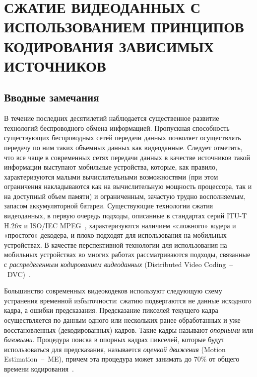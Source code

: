 \newpage
\chapter{СЖАТИЕ ВИДЕОДАННЫХ С ИСПОЛЬЗОВАНИЕМ ПРИНЦИПОВ КОДИРОВАНИЯ ЗАВИСИМЫХ ИСТОЧНИКОВ}
\label{chap1}

\section{Вводные замечания}

В течение последних десятилетий наблюдается существенное развитие технологий беспроводного обмена информацией. Пропускная способность существующих беспроводных сетей передачи данных позволяет осуществлять передачу по ним таких объемных данных как видеоданные. Следует отметить, что все чаще в современных сетях передачи данных в качестве источников такой информации выступают мобильные устройства, которые, как правило, характеризуются малыми вычислительными возможностями (при этом ограничения накладываются как на вычислительную мощность процессора, так и на доступный объем памяти) и ограниченным, зачастую трудно восполняемым, запасом аккумуляторной батареи. Существующие технологии сжатия видеоданных, в первую очередь подходы, описанные в стандартах серий ITU-T H.26x и ISO/IEC MPEG~\cite{Richardson}, характеризуются наличием «сложного» кодера и «простого» декодера, и плохо подходят для использования на мобильных устройствах. В качестве перспективной технологии для использования на мобильных устройствах во многих работах рассматриваются подходы, связанные с \textit{распределенным кодированием видеоданных} (Distributed Video Coding~--~DVC)~\cite{2397}.

Большинство современных видеокодеков используют следующую схему устранения временной избыточности: сжатию подвергаются не данные исходного кадра, а ошибки предсказания. Предсказание пикселей текущего кадра осуществляется по данным одного или нескольких ранее обработанных и уже восстановленных (декодированных) кадров. Такие кадры называют \textit{опорными} или \textit{базовыми}. Процедура поиска в опорных кадрах пикселей, которые будут использоваться для предсказания, называется \textit{оценкой движения} (Motion Estimation~--~ME), причем эта процедура может занимать до $70$\% от общего времени кодирования~\cite{5089121}.

